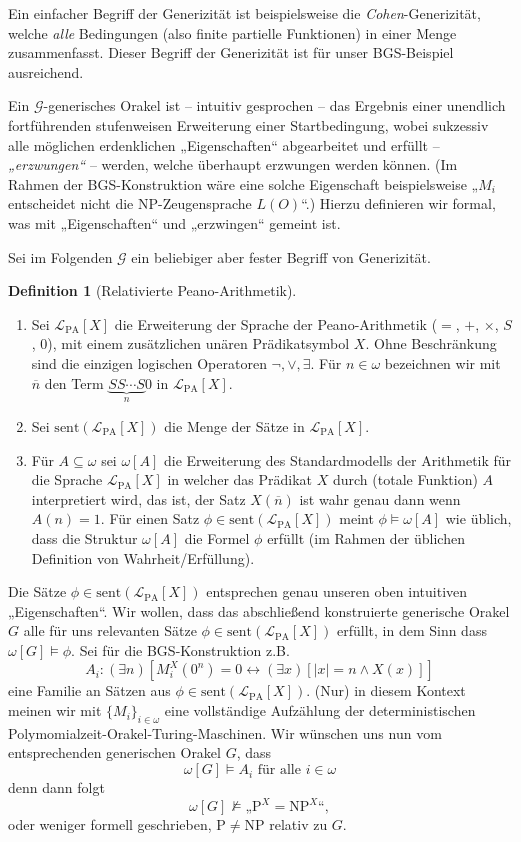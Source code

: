 \documentclass[nofonts]{uebung}
\theoremstyle{definition}
\newtheorem{definition}[theorem]{Definition}
\def\P{\ensuremath{\mathrm{P}}}
\def\NP{\ensuremath{\mathrm{NP}}}
\begin{document}
Ein einfacher Begriff der Generizität ist beispielsweise die \emph{Cohen}-Generizität, welche \emph{alle} Bedingungen (also finite partielle Funktionen) in einer Menge zusammenfasst.
Dieser Begriff der Generizität ist für unser BGS-Beispiel ausreichend.

Ein $\mathcal G$-generisches Orakel ist -- intuitiv gesprochen -- das Ergebnis einer unendlich fortführenden stufenweisen Erweiterung einer Startbedingung, wobei sukzessiv alle möglichen erdenklichen „Eigenschaften“ abgearbeitet und erfüllt -- \emph{„erzwungen“} -- werden, welche überhaupt erzwungen werden können. (Im Rahmen der BGS-Konstruktion wäre eine solche Eigenschaft beispielsweise „$M_i$ entscheidet nicht die NP-Zeugensprache $L(O)$“.)
Hierzu definieren wir formal, was mit „Eigenschaften“ und „erzwingen“ gemeint ist.

Sei im Folgenden $\mathcal G$ ein beliebiger aber fester Begriff von Generizität.
\begin{definition}[Relativierte Peano-Arithmetik]
    \begin{enumerate}
        \item Sei $\mathcal L_{\mathrm{PA}}[X]$ die Erweiterung der Sprache der Peano-Arithmetik ($=$, $+$, $\times$, $S$, $0$), mit einem zusätzlichen unären Prädikatsymbol $X$.
Ohne Beschränkung sind die einzigen logischen Operatoren $\neg, \lor, \exists$.
Für $n\in\omega$ bezeichnen wir mit $\overline{n}$ den Term $\underbrace{SS\cdots S}_{n}0$ in $\mathcal L_{\mathrm{PA}}[X]$. 
        \item Sei $\mathrm{sent}(\mathcal L_{\mathrm{PA}}[X])$ die Menge der Sätze in $\mathcal L_{\mathrm{PA}}[X]$.
        \item Für $A\subseteq\omega$ sei $\omega[A]$ die Erweiterung des Standardmodells der Arithmetik für die Sprache $\mathcal L_{\mathrm{PA}}[X]$ in welcher das Prädikat $X$ durch (totale Funktion) $A$ interpretiert wird, das ist, der Satz $X(\overline{n})$ ist wahr genau dann wenn $A(n)=1$.
            Für einen Satz $\phi\in\mathrm{sent}(\mathcal L_{\mathrm{PA}}[X])$ meint $\phi\vDash \omega[A]$ wie üblich, dass die Struktur $\omega[A]$ die Formel $\phi$ erfüllt (im Rahmen der üblichen Definition von Wahrheit/Erfüllung).
    \end{enumerate}
\end{definition}
Die Sätze $\phi\in\mathrm{sent}(\mathcal L_{\mathrm{PA}}[X])$ entsprechen genau unseren oben intuitiven „Eigenschaften“.
Wir wollen, dass das abschließend konstruierte generische Orakel $G$ alle für uns relevanten Sätze $\phi\in\mathrm{sent}(\mathcal L_{\mathrm{PA}}[X])$ erfüllt, in dem Sinn dass $\omega[G]\vDash \phi$.
Sei für die BGS-Konstruktion z.B.
\[ A_i : (\exists n)[M^X_i(0^n)=0 \leftrightarrow (\exists x)[|x|=n\land X(x)]] \]
eine Familie an Sätzen aus $\phi\in\mathrm{sent}(\mathcal L_{\mathrm{PA}}[X])$. (Nur) in diesem Kontext meinen wir mit $\{M_i\}_{i\in\omega}$ eine vollständige Aufzählung der deterministischen Polymomialzeit-Orakel-Turing-Maschinen.
Wir wünschen uns nun vom entsprechenden generischen Orakel $G$, dass 
\[ \omega[G] \vDash A_i \text{ für alle $i\in\omega$} \]
denn dann folgt
\[ \omega[G] \not\vDash „\P^X=\NP^X“, \]
oder weniger formell geschrieben, $\P\neq\NP$ relativ zu $G$.
\end{document}
